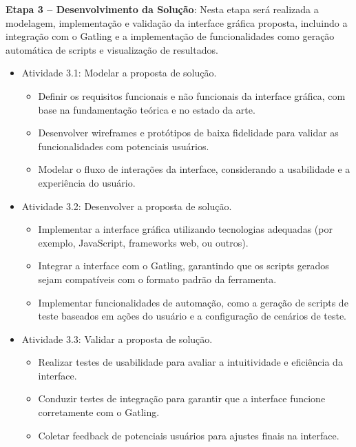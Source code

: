 \documentclass[
	12pt,
	openright,
	twoside,
	a4paper,
	english,
	brazil
	]{abntex2}
\begin{document}
\textbf{Etapa 3 -- Desenvolvimento da Solução}: Nesta etapa será realizada a modelagem, implementação e validação da interface gráfica proposta, incluindo a integração com o Gatling e a implementação de funcionalidades como geração automática de scripts e visualização de resultados.

\begin{itemize}

  \item[] Atividade 3.1: Modelar a proposta de solução.

    \begin{itemize}
      \item Definir os requisitos funcionais e não funcionais da interface gráfica, com base na fundamentação teórica e no estado da arte.
      \item Desenvolver wireframes e protótipos de baixa fidelidade para validar as funcionalidades com potenciais usuários.
      \item Modelar o fluxo de interações da interface, considerando a usabilidade e a experiência do usuário.
    \end{itemize}

  \item[] Atividade 3.2: Desenvolver a proposta de solução.

    \begin{itemize}
        \item Implementar a interface gráfica utilizando tecnologias adequadas (por exemplo, JavaScript, frameworks web, ou outros).
        \item Integrar a interface com o Gatling, garantindo que os scripts gerados sejam compatíveis com o formato padrão da ferramenta.
        \item Implementar funcionalidades de automação, como a geração de scripts de teste baseados em ações do usuário e a configuração de cenários de teste.
      \end{itemize}

  \item[] Atividade 3.3: Validar a proposta de solução.

    \begin{itemize}
      \item Realizar testes de usabilidade para avaliar a intuitividade e eficiência da interface.
      \item Conduzir testes de integração para garantir que a interface funcione corretamente com o Gatling.
      \item Coletar feedback de potenciais usuários para ajustes finais na interface.
    \end{itemize}

\end{itemize}
\end{document}
